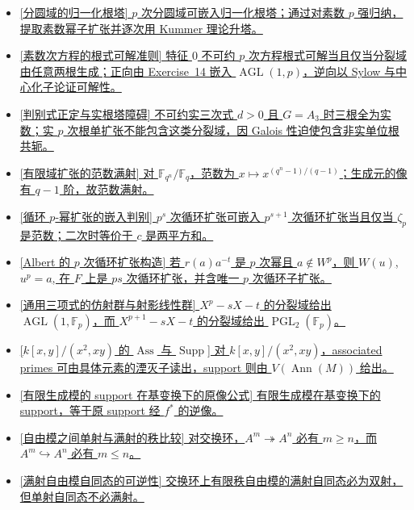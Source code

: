 \documentclass[a4paper]{ctexart}
\theoremstyle{definition}
\theoremstyle{analysis}
\theoremstyle{plain}
\begin{document}
\begin{itemize}
  \item \hyperref[subsec:problem-normalized-root-tower]{[分圆域的归一化根塔] \(p\) 次分圆域可嵌入归一化根塔；通过对素数 \(p\) 强归纳，提取素数幂子扩张并逐次用 Kummer 理论升塔。}
  \item \hyperref[subsec:problem-galois-two-root]{[素数次方程的根式可解准则] 特征 \(0\) 不可约 \(p\) 次方程根式可解当且仅当分裂域由任意两根生成；正向由 Exercise~14 嵌入 \(\operatorname{AGL}(1,p)\)，逆向以 Sylow 与中心化子论证可解性。}
  \item \hyperref[subsec:problem-real-cubic-radical]{[判别式正定与实根塔障碍] 不可约实三次式 \(d>0\) 且 \(G=A_3\) 时三根全为实数；实 \(p\) 次根单扩张不能包含这类分裂域，因 Galois 性迫使包含非实单位根共轭。}
  \item \hyperref[subsec:problem-finite-field-norm-surjective]{[有限域扩张的范数满射] 对 \(\mathbb F_{q^n}/\mathbb F_q\)，范数为 \(x\mapsto x^{(q^n-1)/(q-1)}\)；生成元的像有 \(q-1\) 阶，故范数满射。}
  \item \hyperref[subsec:problem-cyclic-p-power-embedding]{[循环 \(p\)-幂扩张的嵌入判别] \(p^s\) 次循环扩张可嵌入 \(p^{s+1}\) 次循环扩张当且仅当 \(\zeta_p\) 是范数；二次时等价于 \(c\) 是两平方和。}
  \item \hyperref[subsec:problem-albert-cyclic-degree-p]{[Albert 的 \(p\) 次循环扩张构造] 若 \(r(a)a^{-t}\) 是 \(p\) 次幂且 \(a\notin W^p\)，则 \(W(u)\), \(u^p=a\), 在 \(F\) 上是 \(ps\) 次循环扩张，并含唯一 \(p\) 次循环子扩张。}
  \item \hyperref[subsec:problem-uchida-generic-trinomials]{[通用三项式的仿射群与射影线性群] \(X^p-sX-t\) 的分裂域给出 \(\operatorname{AGL}(1,\mathbb F_p)\)，而 \(X^{p+1}-sX-t\) 的分裂域给出 \(\operatorname{PGL}_2(\mathbb F_p)\)。}
  \item \hyperref[subsec:problem-ass-support-kxy]{[\(k[x,y]/(x^2,xy)\) 的 \(\operatorname{Ass}\) 与 \(\operatorname{Supp}\)] 对 \(k[x,y]/(x^2,xy)\)，associated primes 可由具体元素的湮灭子读出，support 则由 \(V(\operatorname{Ann}(M))\) 给出。}
  \item \hyperref[subsec:problem-support-base-change]{[有限生成模的 support 在基变换下的原像公式] 有限生成模在基变换下的 support，等于原 support 经 \(f^*\) 的逆像。}
  \item \hyperref[subsec:problem-free-rank-comparison]{[自由模之间单射与满射的秩比较] 对交换环，\(A^m\twoheadrightarrow A^n\) 必有 \(m\ge n\)，而 \(A^m\hookrightarrow A^n\) 必有 \(m\le n\)。}
  \item \hyperref[subsec:problem-surjective-free-endomorphism]{[满射自由模自同态的可逆性] 交换环上有限秩自由模的满射自同态必为双射，但单射自同态不必满射。}

\end{itemize}
\end{document}
